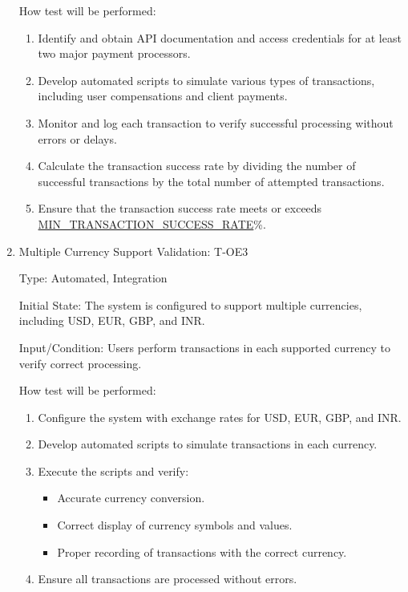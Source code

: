 \documentclass[12pt, titlepage]{article}
\begin{document}
\begin{enumerate}
How test will be performed:
\begin{enumerate}
    \item Identify and obtain API documentation and access credentials for at least two major payment processors.
    \item Develop automated scripts to simulate various types of transactions, including user compensations and client payments.
    \item Monitor and log each transaction to verify successful processing without errors or delays.
    \item Calculate the transaction success rate by dividing the number of successful transactions by the total number of attempted transactions.
    \item Ensure that the transaction success rate meets or exceeds \\ \hyperref[MIN_TRANSACTION_SUCCESS_RATE]{MIN\_TRANSACTION\_SUCCESS\_RATE}\%.
\end{enumerate}

\item{Multiple Currency Support Validation: T-OE3\\}

Type: Automated, Integration

Initial State: The system is configured to support multiple currencies, including USD, EUR, GBP, and INR.

Input/Condition: Users perform transactions in each supported currency to verify correct processing.

How test will be performed:
\begin{enumerate}
    \item Configure the system with exchange rates for USD, EUR, GBP, and INR.
    \item Develop automated scripts to simulate transactions in each currency.
    \item Execute the scripts and verify:
    \begin{itemize}
        \item Accurate currency conversion.
        \item Correct display of currency symbols and values.
        \item Proper recording of transactions with the correct currency.
    \end{itemize}
    \item Ensure all transactions are processed without errors.
\end{enumerate}


\end{enumerate}
\end{document}
